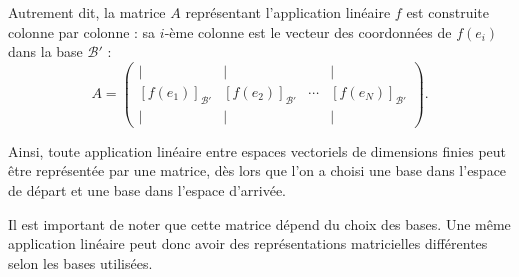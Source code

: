 Autrement dit, la matrice $A$ représentant l'application linéaire $f$ est construite colonne
par colonne : sa $i$-ème colonne est le vecteur des coordonnées de $f(e_i)$ dans la base
$\mathcal{B}'$ :
\[
A
=
\begin{pmatrix}
| & | &        & | \\
[f(e_1)]_{\mathcal{B}'} & [f(e_2)]_{\mathcal{B}'} & \cdots & [f(e_N)]_{\mathcal{B}'} \\
| & | &        & |
\end{pmatrix}.
\]

Ainsi, toute application linéaire entre espaces vectoriels de dimensions finies peut être
représentée par une matrice, dès lors que l'on a choisi une base dans l'espace de départ
et une base dans l'espace d'arrivée.

Il est important de noter que cette matrice dépend du choix des bases. Une même application
linéaire peut donc avoir des représentations matricielles différentes selon les bases utilisées.